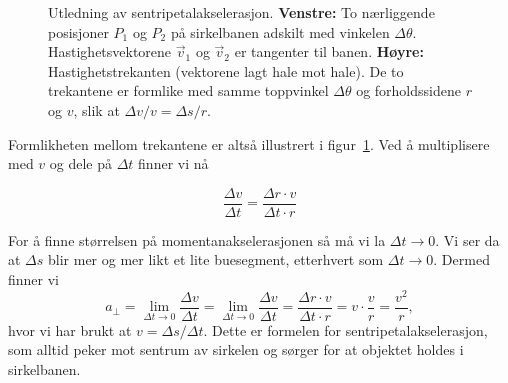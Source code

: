 \begin{figure}[h]
\begin{minipage}[t]{0.46\textwidth}
\end{minipage}
\caption{Utledning av sentripetalakselerasjon.
\textbf{Venstre:} To nærliggende posisjoner $P_1$ og $P_2$ på sirkelbanen adskilt med vinkelen $\Delta\theta$. Hastighetsvektorene $\vec{v}_1$ og $\vec{v}_2$ er tangenter til banen.
\textbf{Høyre:} Hastighetstrekanten (vektorene lagt hale mot hale). De to trekantene er formlike med samme toppvinkel $\Delta\theta$ og forholdssidene $r$ og $v$, slik at $\Delta v/v = \Delta s/r$.}
\label{fig:Sentripetalakselerasjon}
\end{figure}
Formlikheten mellom trekantene er altså illustrert i figur~\ref{fig:Sentripetalakselerasjon}. Ved å multiplisere med $v$ og dele på $\Delta t$ finner vi nå 

\[
    \frac{\Delta v}{\Delta t} = \frac{\Delta r \cdot v}{\Delta t \cdot r}
    \]

For å finne størrelsen på momentanakselerasjonen så må vi la \( \Delta t \to 0 \). Vi ser da at $\Delta s$ blir mer og mer likt et lite buesegment, etterhvert som $\Delta t \to 0$. Dermed finner vi
    \[
    a_\perp = \lim_{\Delta t \to 0} \frac{\Delta v}{\Delta t} = \lim_{\Delta t \to 0} \frac{\Delta v}{\Delta t} = \frac{\Delta r \cdot v}{\Delta t \cdot r}={v}\cdot \frac{v}{r}=\frac{v^2}{r},
    \]
hvor vi har brukt at $v=\Delta s/\Delta t$. Dette er formelen for sentripetalakselerasjon, som alltid peker mot sentrum av sirkelen og sørger for at objektet holdes i sirkelbanen.


